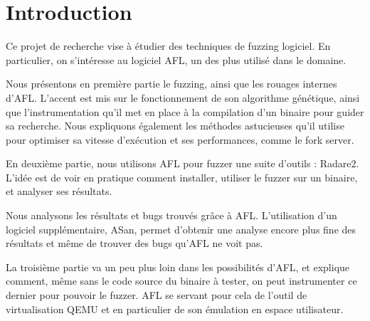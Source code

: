 \chapter*{Introduction}

Ce projet de recherche vise à étudier des techniques de fuzzing logiciel. En
particulier, on s'intéresse au logiciel AFL, un des plus utilisé dans le
domaine.

Nous présentons en première partie le fuzzing, ainsi que les rouages internes
d'AFL. L'accent est mis sur le fonctionnement de son algorithme génétique,
ainsi que l'instrumentation qu'il met en place à la compilation
d'un binaire pour guider sa recherche. Nous expliquons également les
méthodes astucieuses qu'il utilise pour optimiser sa vitesse d'exécution
et ses performances, comme le fork server.

En deuxième partie, nous utilisons AFL pour fuzzer une suite d'outils :
Radare2. L'idée est de voir en pratique comment installer, utiliser
le fuzzer sur un binaire, et analyser ses résultats.

Nous analysons les résultats et bugs trouvés grâce à AFL. L'utilisation
d'un logiciel supplémentaire, ASan, permet d'obtenir une analyse encore
plus fine des résultats et même de trouver des bugs qu'AFL ne voit pas.

La troisième partie va un peu plus loin dans les possibilités d'AFL, et
explique comment, même sans le code source du binaire à tester, on peut
instrumenter ce dernier pour pouvoir le fuzzer. AFL se servant pour cela de
l'outil de virtualisation QEMU et en particulier de son émulation en
espace utilisateur.

